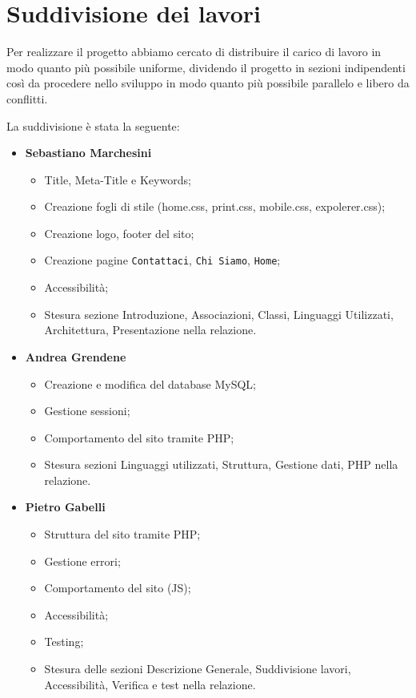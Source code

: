 \section{Suddivisione dei lavori}{
	Per realizzare il progetto abbiamo cercato di distribuire il carico di lavoro in modo quanto più possibile uniforme, dividendo il progetto in sezioni indipendenti così da procedere nello sviluppo in modo quanto più possibile parallelo e libero da conflitti.
	
	La suddivisione è stata la seguente: 	
	\begin{itemize}\itemsep1pt
		\item \textbf{Sebastiano Marchesini} 
		\begin{itemize}\itemsep1pt
			\item Title, Meta-Title e Keywords;
			\item Creazione fogli di stile (home.css, print.css, mobile.css, expolerer.css);
			\item Creazione logo, footer del sito;
			\item Creazione pagine \texttt{Contattaci}, \texttt{Chi Siamo}, \texttt{Home};
			\item Accessibilità;
			\item Stesura sezione Introduzione, Associazioni, Classi, Linguaggi Utilizzati, Architettura, Presentazione nella relazione.
		\end{itemize}
		\item \textbf{Andrea Grendene}
		\begin{itemize}\itemsep1pt
			\item Creazione e modifica del database MySQL;
			\item Gestione sessioni;
			\item Comportamento del sito tramite PHP;
			\item Stesura sezioni Linguaggi utilizzati, Struttura, Gestione dati, PHP nella relazione.
		\end{itemize}
		\item \textbf{Pietro Gabelli}
		\begin{itemize}\itemsep1pt
			\item Struttura del sito tramite PHP;
			\item Gestione errori;
			\item Comportamento del sito (JS);
			\item Accessibilità;
			\item Testing;
			\item Stesura delle sezioni Descrizione Generale, Suddivisione lavori, Accessibilità, Verifica e test nella relazione.
		\end{itemize}
	\end{itemize}
}